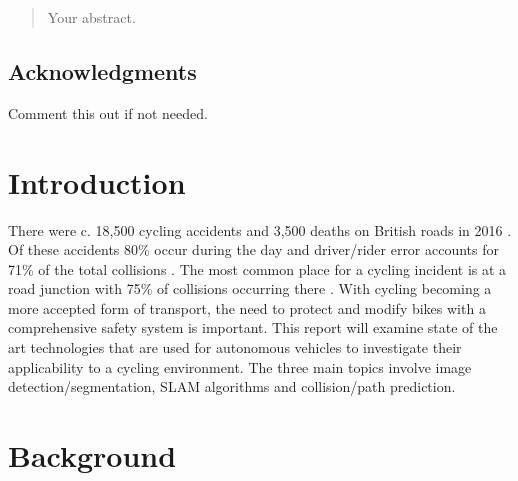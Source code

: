 \documentclass[11pt,twoside]{report}
\date{September 2015}
\begin{document}



\clearpage{\pagestyle{empty}\cleardoublepage}
\setcounter{page}{1}
\pagestyle{fancy}

\begin{abstract}
Your abstract.
\end{abstract}

\cleardoublepage
\section*{Acknowledgments}
Comment this out if not needed.

\clearpage{\pagestyle{empty}\cleardoublepage}

\tableofcontents 


\clearpage{\pagestyle{empty}\cleardoublepage}
\setcounter{page}{1}
\fancyhead[LE,RO]{\slshape \rightmark}
\fancyhead[LO,RE]{\slshape \leftmark}


\chapter{Introduction}

There were c. 18,500 cycling accidents and 3,500 deaths on British roads in 2016 \cite{DFT_fig}. Of these accidents 80\% occur during the day and driver/rider error accounts for 71\% of the total collisions \cite{DFT_fig2}. The most common place for a cycling incident is at a road junction with 75\% of collisions occurring there \cite{DFT_fig3}. With cycling becoming a more accepted form of transport, the need to protect and modify bikes with a comprehensive safety system is important.
\newline\newline
This report will examine state of the art technologies that are used for autonomous vehicles to investigate their applicability to a cycling environment. The three main topics involve image detection/segmentation, SLAM algorithms and collision/path prediction. 

\newpage




\chapter{Background}
\end{document}
